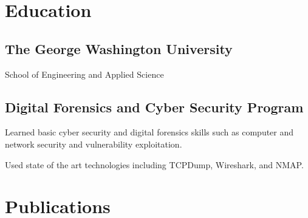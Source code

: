 \documentclass[]{deedy-resume-openfont}
\begin{document}
\begin{minipage}[t]{0.66\textwidth}



        \section{Education}
        \subsection{The George Washington University}
        School of Engineering and Applied Science\\
        \vspace{\topsep}
        \sectionsep

        \subsection{Digital Forensics and Cyber Security Program}
        \vspace{\topsep}
        \begin{tightemize}
        \item Learned basic cyber security and digital forensics skills such as computer and network security and vulnerability exploitation.
        \item Used state of the art technologies including TCPDump, Wireshark, and NMAP.
        \end{tightemize}


        \section{Publications}

\end{minipage}
\end{document}
